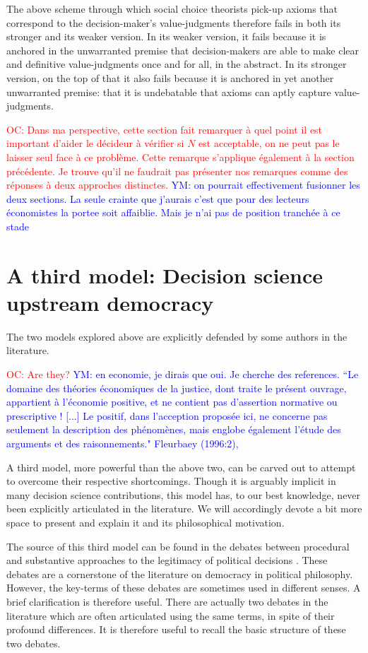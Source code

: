 \documentclass[preprint, french, english, 11pt]{elsarticle}%
\newcommand{\commentYM}[1]{\textcolor{blue}{YM: #1}}
\newcommand{\commentOC}[1]{\textcolor{red}{OC: #1}}
\begin{document}
The above scheme through which social choice theorists pick-up axioms that correspond to the decision-maker's value-judgments therefore fails in both its stronger and its weaker version. In its weaker version, it fails because it is anchored in the unwarranted premise that decision-makers are able to make clear and definitive value-judgments once and for all, in the abstract. In its stronger version, on the top of that it also fails because it is anchored in yet another unwarranted premise: that it is undebatable that axioms can aptly capture value-judgments.

\commentOC{Dans ma perspective, cette section fait remarquer à quel point il est important d’aider le décideur à vérifier si $N$ est acceptable, on ne peut pas le laisser seul face à ce problème. Cette remarque s’applique également à la section précédente. Je trouve qu’il ne faudrait pas présenter nos remarques comme des réponses à deux approches distinctes.}
\commentYM{on pourrait effectivement fusionner les deux sections. La seule crainte que j'aurais c'est que pour des lecteurs économistes la portee soit affaiblie. Mais je n'ai pas de position tranchée à ce stade}

\section{A third model: Decision science upstream democracy}
The two models explored above are explicitly defended by some authors in the literature. 

\commentOC{ Are they?}
\commentYM{en economie, je dirais que oui. Je cherche des references.
“Le domaine des théories économiques de la justice, dont traite le présent ouvrage, appartient
à l’économie positive, et ne contient pas d’assertion normative ou prescriptive ! [...] Le positif,
dans l’acception proposée ici, ne concerne pas seulement la description des phénomènes, mais englobe
également l’étude des arguments et des raisonnements." Fleurbaey (1996:2),} 

A third model, more powerful than the above two, can be carved out to attempt to overcome their respective shortcomings. Though it is arguably implicit in many decision science contributions, this model has, to our best knowledge, never been explicitly articulated in the literature. We will accordingly devote a bit more space to present and explain it and its philosophical motivation.

The source of this third model can be found in the debates between procedural and substantive approaches to the legitimacy of political decisions \cite{meinard_what_2017}. These debates are a cornerstone of the literature on democracy in political philosophy. However, the key-terms of these debates are sometimes used in different senses. A brief clarification is therefore useful. There are actually two debates in the literature which are often articulated using the same terms, in spite of their profound differences. It is therefore useful to recall the basic structure of these two debates.
\end{document}
